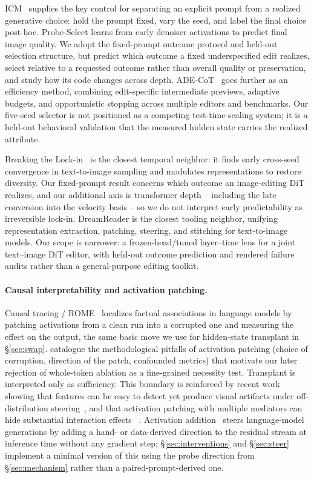 \documentclass[10pt,twocolumn,letterpaper]{article}
\begin{document}
ICM~\citep{zaleska2026icm} supplies the key control for separating an
explicit prompt from a realized generative choice: hold the prompt fixed,
vary the seed, and label the final choice post hoc. Probe-Select
\citep{guo2026probeselect} learns from early denoiser activations to predict
final image quality. We adopt the fixed-prompt outcome protocol and held-out selection structure,
but predict which outcome a fixed underspecified edit realizes, select relative
to a requested outcome rather than overall quality or preservation, and study
how its code changes across depth. ADE-CoT~\citep{qu2026adecot} goes further as
an efficiency method, combining edit-specific intermediate previews, adaptive
budgets, and opportunistic stopping across multiple editors and benchmarks. Our
five-seed selector is not positioned as a competing test-time-scaling system;
it is a held-out behavioral validation that the measured hidden state carries
the realized attribute.

Breaking the Lock-in~\citep{kwon2026lockin} is the closest temporal neighbor:
it finds early cross-seed convergence in text-to-image sampling and modulates
representations to restore diversity. Our fixed-prompt result concerns which
outcome an image-editing DiT realizes, and our additional axis is transformer
depth -- including the late conversion into the velocity basis -- so we do not
interpret early predictability as irreversible lock-in. DreamReader
\citep{prakash2026dreamreader} is the closest tooling neighbor, unifying
representation extraction, patching, steering, and stitching for text-to-image
models. Our scope is narrower: a frozen-head/tuned layer--time lens for a joint
text--image DiT editor, with held-out outcome prediction and rendered failure
audits rather than a general-purpose editing toolkit.

\paragraph{Causal interpretability and activation patching.} Causal
tracing / ROME~\citep{meng2022rome} localizes factual associations in
language models by patching activations from a clean run into a
corrupted one and measuring the effect on the output, the same basic
move we use for hidden-state transplant in \S\ref{sec:swap}.
\citet{heimersheim2024activation} catalogue the methodological pitfalls
of activation patching (choice of corruption, direction of the patch,
confounded metrics) that motivate our later rejection of whole-token
ablation as a fine-grained necessity test. Transplant is interpreted
only as sufficiency. This boundary is reinforced by recent work showing that
features can be easy to detect yet produce visual artifacts under
off-distribution steering~\citep{cassano2026look}, and that activation
patching with multiple mediators can hide substantial interaction effects
~\citep{vaidyanathan2026curse}. Activation
addition~\citep{turner2023actadd} steers language-model generations by
adding a hand- or data-derived direction to the residual stream at
inference time without any gradient step; \S\ref{sec:interventions} and
\S\ref{sec:steer} implement a minimal version of this using the
probe direction from \S\ref{sec:mechanism} rather than a
paired-prompt-derived one.
\end{document}
